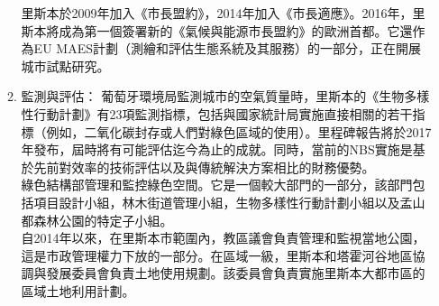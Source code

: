 \documentclass[a4paper,12pt]{article}
\begin{document}
\begin{enumerate}
\begin{enumerate}
里斯本於2009年加入《市長盟約》，2014年加入《市長適應》。2016年，里斯本將成為第一個簽署新的《氣候與能源市長盟約》的歐洲首都。它還作為EU MAES計劃（測繪和評估生態系統及其服務）的一部分，正在開展城市試點研究。\\
\item 監測與評估：
\label{sec:org61d62ba}
葡萄牙環境局監測城市的空氣質量時，里斯本的《生物多樣性行動計劃》有23項監測指標，包括與國家統計局實施直接相關的若干指標（例如，二氧化碳封存或人們對綠色區域的使用）。里程碑報告將於2017年發布，屆時將有可能評估迄今為止的成就。同時，當前的NBS實施是基於先前對效率的技術評估以及與傳統解決方案相比的財務優勢。\\

綠色結構部管理和監控綠色空間。它是一個較大部門的一部分，該部門包括項目設計小組，林木街道管理小組，生物多樣性行動計劃小組以及孟山都森林公園的特定子小組。\\

自2014年以來，在里斯本市範圍內，教區議會負責管理和監視當地公園，這是市政管理權力下放的一部分。在區域一級，里斯本和塔霍河谷地區協調與發展委員會負責土地使用規劃。該委員會負責實施里斯本大都市區的區域土地利用計劃。\\
\end{enumerate}
\end{enumerate}
\end{document}
